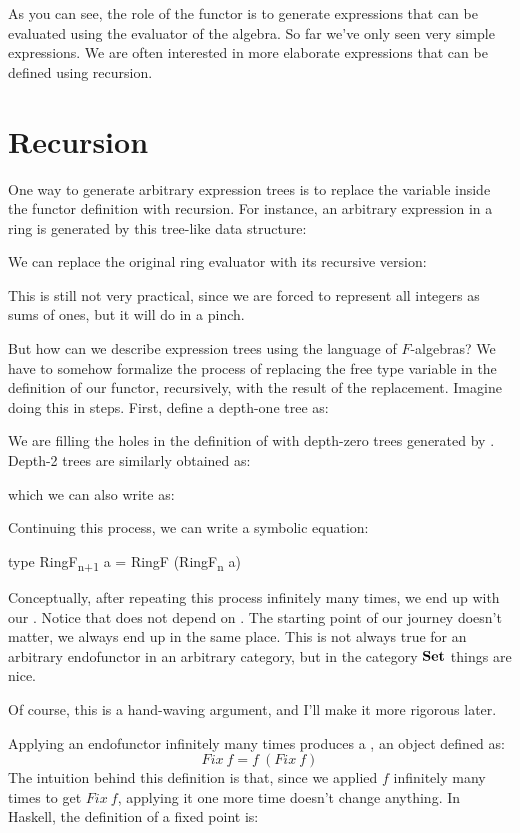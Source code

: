 As you can see, the role of the functor is to generate expressions that
can be evaluated using the evaluator of the algebra. So far we've only
seen very simple expressions. We are often interested in more elaborate
expressions that can be defined using recursion.

\section{Recursion}

One way to generate arbitrary expression trees is to replace the
variable  inside the functor definition with recursion. For
instance, an arbitrary expression in a ring is generated by this
tree-like data structure:

We can replace the original ring evaluator with its recursive version:

This is still not very practical, since we are forced to represent all
integers as sums of ones, but it will do in a pinch.

But how can we describe expression trees using the language of
$F$-algebras? We have to somehow formalize the process of replacing the
free type variable in the definition of our functor, recursively, with
the result of the replacement. Imagine doing this in steps. First,
define a depth-one tree as:

We are filling the holes in the definition of  with
depth-zero trees generated by . Depth-2 trees are
similarly obtained as:

which we can also write as:

Continuing this process, we can write a symbolic equation:

\begin{snipv}
	type RingF\textsubscript{n+1} a = RingF (RingF\textsubscript{n} a)
\end{snipv}
Conceptually, after repeating this process infinitely many times, we end
up with our . Notice that  does not depend on
. The starting point of our journey doesn't matter, we always
end up in the same place. This is not always true for an arbitrary
endofunctor in an arbitrary category, but in the category $\mathbf{Set}$
things are nice.

Of course, this is a hand-waving argument, and I'll make it more
rigorous later.

Applying an endofunctor infinitely many times produces a , an object defined as:
\[\mathit{Fix}\ f = f\ (\mathit{Fix}\ f)\]
The intuition behind this definition is that, since we applied
$f$ infinitely many times to get $\mathit{Fix}\ f$, applying it one
more time doesn't change anything. In Haskell, the definition of a fixed
point is:

